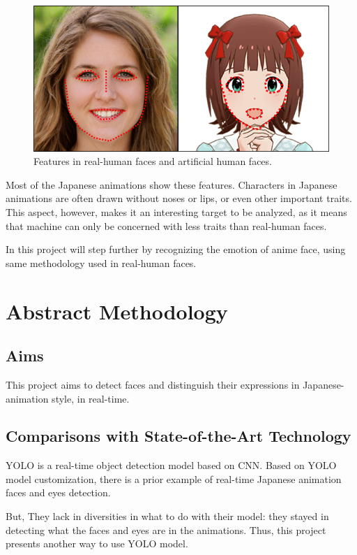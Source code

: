 \documentclass{article}
\begin{document}
\begin{figure}[ht]
\vskip 0.2in
\begin{center}
\centerline{\includegraphics[width=\columnwidth]{featured_compare.png}}
\caption{Features in real-human faces and artificial human faces.}
\label{icml-historical}
\end{center}
\vskip -0.2in
\end{figure}

Most of the Japanese animations show these features. Characters in Japanese animations are often drawn without noses or lips, or even other important traits. This aspect, however, makes it an interesting target to be analyzed, as it means that machine can only be concerned with less traits than real-human faces.

In this project will step further by recognizing the emotion of anime face, using same methodology used in real-human faces.

\section{Abstract Methodology}
\subsection{Aims}
This project aims to detect faces and distinguish their expressions in Japanese-animation style, in real-time.

\subsection{Comparisons with State-of-the-Art Technology}
YOLO is a real-time object detection model based on CNN.
Based on YOLO model customization, there is a prior example of real-time Japanese animation faces and eyes detection\cite{peter2017darkflow}.

But, They lack in diversities in what to do with their model: they stayed in detecting what the faces and eyes are in the animations.
Thus, this project presents another way to use YOLO model.
\end{document}
